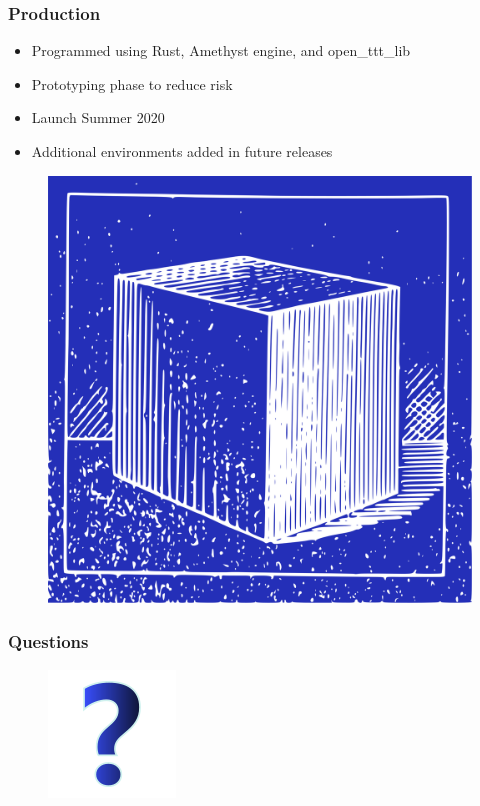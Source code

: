\documentclass{beamer}
\begin{document}
\begin{frame}
  \frametitle{Production}

  \begin{itemize}
    \item Programmed using Rust, Amethyst engine, and open\_ttt\_lib
    \item Prototyping phase to reduce risk
    \item Launch Summer 2020
    \item Additional environments added in future releases
  \end{itemize}

  \begin{figure}
    \vspace{1em}
    \includegraphics[height=0.40\textheight]{img/clip-art/blueprint-cube}
  \end{figure}

\end{frame}


\begin{frame}
  \frametitle{Questions}

  \begin{figure}
    \includegraphics[height=0.50\textheight]{img/clip-art/question-mark}
  \end{figure}

\end{frame}
\end{document}

